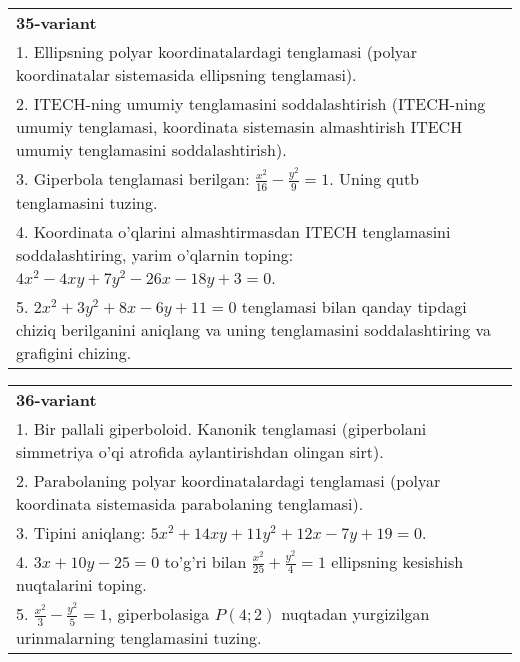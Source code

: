 \documentclass{article}
\begin{document}
\begin{tabular}{m{17cm}}
\textbf{35-variant}\\
1. Ellipsning polyar koordinatalardagi tenglamasi (polyar koordinatalar sistemasida ellipsning tenglamasi).\\

2. ITECH-ning umumiy tenglamasini soddalashtirish (ITECH-ning umumiy tenglamasi, koordinata sistemasin almashtirish ITECH umumiy tenglamasini soddalashtirish).\\

3. Giperbola tenglamasi berilgan: $\frac{x^{2}}{16}-\frac{y^{2}}{9}=1$. Uning qutb tenglamasini tuzing.\\

4. Koordinata o'qlarini almashtirmasdan ITECH tenglamasini soddalashtiring, yarim o'qlarnin toping: $4x^{2} - 4xy + 7y^{2} - 26x - 18y + 3 = 0$.\\

5. $2x^{2} + 3y^{2} + 8x - 6y + 11 = 0$ tenglamasi bilan qanday tipdagi chiziq berilganini aniqlang va uning tenglamasini soddalashtiring va grafigini chizing.  
\end{tabular}
\vspace{1cm}


\begin{tabular}{m{17cm}}
\textbf{36-variant}\\
1. Bir pallali giperboloid. Kanonik tenglamasi (giperbolani simmetriya o'qi atrofida aylantirishdan olingan sirt).\\

2. Parabolaning polyar koordinatalardagi tenglamasi (polyar koordinata sistemasida parabolaning tenglamasi).\\

3. Tipini aniqlang: $5x^{2}+14xy+11y^{2}+12x-7y+19=0$.\\

4. $3x + 10y - 25 = 0$ to'g'ri bilan $\frac{x^{2}}{25} + \frac{y^{2}}{4} = 1$ ellipsning kesishish nuqtalarini toping.  \\

5. $\frac{x^{2}}{3} - \frac{y^{2}}{5} = 1$, giperbolasiga $P(4;2)$ nuqtadan yurgizilgan urinmalarning tenglamasini tuzing.  
\end{tabular}
\vspace{1cm}
\end{document}
